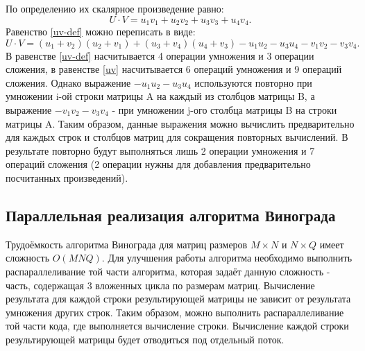 \documentclass[12pt, a4paper]{report}
\begin{document}
	По определению их скалярное произведение равно:\\
	\begin{equation}
	\label{uv-def}
	U \cdot V = u_{1}v_{1} + u_{2}v_{2} + u_{3}v_{3} + u_{4}v_{4}.
	\end{equation}
	Равенство \ref{uv-def} можно переписать в виде:\\
	\begin{equation}
	\label{uv}
	U \cdot V = (u_{1} + v_{2})(u_{2} + v_{1}) + (u_{3} + v_{4})(u_{4} + v_{3}) - u_{1}u_{2} - u_{3}u_{4} - v_{1}v_{2} - v_{3}v_{4}.
	\end{equation}
	В равенстве \ref{uv-def} насчитывается 4 операции умножения и 3 операции сложения, в равенстве \ref{uv} насчитывается 6 операций умножения и 9 операций сложения. Однако выражение $- u_{1}u_{2} - u_{3}u_{4}$ используются повторно при умножении i-ой строки матрицы A на каждый из столбцов матрицы B, а выражение $- v_{1}v_{2} - v_{3}v_{4}$ - при умножении j-ого столбца матрицы B на строки матрицы A. Таким образом, данные выражения можно вычислить предварительно для каждых строк и столбцов матриц для сокращения повторных вычислений. В результате повторно будут выполняться лишь 2 операции умножения и 7 операций сложения (2 операции нужны для добавления предварительно посчитанных произведений).
	
	\subsection{Параллельная реализация алгоритма Винограда}
	Трудоёмкость алгоритма Винограда для матриц размеров $M \times N$ и $N \times Q$ имеет сложность $O(MNQ)$. Для улучшения работы алгоритма необходимо выполнить распараллеливание той части алгоритма, которая задаёт данную сложность - часть, содержащая 3 вложенных цикла по размерам матриц.
	Вычисление результата для каждой строки результирующей матрицы не зависит от результата умножения других строк. Таким образом, можно выполнить распараллеливание той части кода, где выполняется вычисление строки. Вычисление каждой строки результирующей матрицы будет отводиться под отдельный поток.
	
\end{document}
